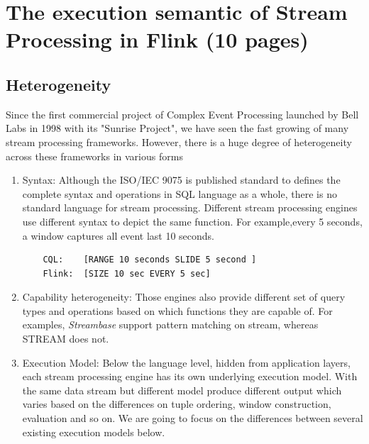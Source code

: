 
\chapter{The execution semantic of Stream Processing in Flink (10 pages)}

\ifpdf
    \graphicspath{{Chapter3/Figs/Raster/}{Chapter3/Figs/PDF/}{Chapter3/Figs/}}
\else
    \graphicspath{{Chapter3/Figs/Vector/}{Chapter3/Figs/}}
\fi

\section{Heterogeneity}
Since the first commercial project of Complex Event Processing launched by Bell Labs in 1998 with its "Sunrise Project", we have seen the fast growing of many stream processing frameworks. However, there is a huge degree of heterogeneity across these frameworks in various forms\citep{Dindar:2013}

\begin{enumerate}

	\item Syntax: Although the ISO/IEC 9075 is published standard to defines the complete syntax and operations in SQL language as a whole, there is no standard language for stream processing. Different stream processing engines use different syntax to depict the same function. For example,every 5 seconds, a window captures all event last 10 seconds. 
	\begin{verbatim}
	CQL: 	[RANGE 10 seconds SLIDE 5 second ] 
	Flink: 	[SIZE 10 sec EVERY 5 sec]
	\end{verbatim}
	
	\item Capability heterogeneity:
	Those engines also provide different set of query types and operations based on which functions they are capable of. For examples, \textit{Streambase} support pattern matching on stream, whereas STREAM does not.
	
	\item Execution Model: Below the language level, hidden from application layers, each stream processing engine has its own underlying execution model. With the same data stream but different model produce different output which varies based on the differences on tuple ordering,  window construction, evaluation and so on. We are going to focus on the differences between several existing execution models below.
	
	
\end{enumerate}
 

